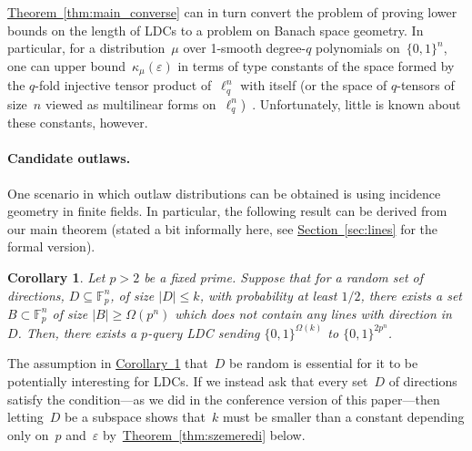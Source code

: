 \documentclass[11pt]{article}
\numberwithin{equation}{section}
\newtheorem{corollary}[theorem]{Corollary}
\theoremstyle{definition}
\theoremstyle{plain}
\newcommand{\expref}[2]{\hyperref[#2]{#1~\ref{#2}}}
\newcommand{\bset}[1]{\{0,1\}^{#1}} %
\newcommand{\eps}{\varepsilon}
\newcommand{\F}{{\mathbb{F}}}
\begin{document}
\expref{Theorem}{thm:main_converse} can in turn convert the problem of proving lower bounds on the length of LDCs to a problem on Banach space geometry.
In particular, for a distribution~$\mu$ over 1-smooth degree-$q$ polynomials on~$\bset{n}$, one can upper bound~$\kappa_\mu(\eps)$ in terms of type constants of the space formed by the $q$-fold injective tensor product of~$\ell_q^n$ with itself (or the space of $q$-tensors of size~$n$ viewed as multilinear forms on~$\ell_q^n$)~\cite{Briet:2015}.
Unfortunately, little is known about these constants, however.

\medskip
\paragraph{Candidate outlaws.}
One scenario in which outlaw distributions can be obtained is using incidence geometry in finite fields. In particular, the  following result can be derived from our main theorem (stated a bit informally here, see \expref{Section}{sec:lines} for the formal version).

\begin{corollary}\label{cor:lines_ldcs_informal}
Let $p>2$ be a fixed prime. Suppose that for a random set of directions, $D\subseteq \F_p^{n}$, %
  of size $|D|\le k$, with probability at least $1/2$, there exists a set $B\subset \F_p^n$  of size $|B|\ge \Omega(p^n)$ which does not contain any lines with direction in $D$.
Then, there exists a $p$-query LDC sending $\bset{\Omega(k)}$ to $\bset{2p^n}$. 
\end{corollary}

The assumption in \expref{Corollary}{cor:lines_ldcs_informal} that~$D$ be random is essential for it to be potentially interesting for LDCs.
If we instead ask that every set~$D$ of directions %
 satisfy the condition---as we did in the conference version of this paper---then letting~$D$ be a subspace shows that~$k$ must be smaller than a constant depending only on~$p$ and~$\eps$ by~\expref{Theorem}{thm:szemeredi} below.
\end{document}
